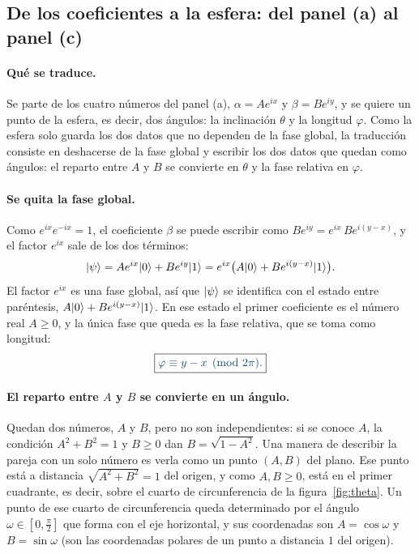 \subsection*{De los coeficientes a la esfera: del panel (a) al panel (c)}

\paragraph{Qué se traduce.}
Se parte de los cuatro números del panel (a), $\alpha=Ae^{ix}$ y $\beta=Be^{iy}$, y se quiere un
punto de la esfera, es decir, dos ángulos: la inclinación $\theta$ y la longitud $\varphi$. Como
la esfera solo guarda los dos datos que no dependen de la fase global, la traducción consiste en
deshacerse de la fase global y escribir los dos datos que quedan como ángulos: el reparto entre
$A$ y $B$ se convierte en $\theta$ y la fase relativa en $\varphi$.

\paragraph{Se quita la fase global.}
Como $e^{ix}e^{-ix}=1$, el coeficiente $\beta$ se puede escribir como
$Be^{iy}=e^{ix}\,Be^{i(y-x)}$, y el factor $e^{ix}$ sale de los dos términos:
\[
  \lvert \psi\rangle=Ae^{ix}\lvert 0\rangle+Be^{iy}\lvert 1\rangle
  =e^{ix}\bigl(A\lvert 0\rangle+Be^{i(y-x)}\lvert 1\rangle\bigr).
\]
El factor $e^{ix}$ es una fase global, así que $\lvert \psi\rangle$ se identifica con el estado entre
paréntesis, $A\lvert 0\rangle+Be^{i(y-x)}\lvert 1\rangle$. En ese estado el primer coeficiente es el número real
$A\ge0$, y la única fase que queda es la fase relativa, que se toma como longitud:
\begin{equation}\label{eq:phi}
  \destacado{\varphi\equiv y-x \pmod{2\pi}.}
\end{equation}

\paragraph{El reparto entre $A$ y $B$ se convierte en un ángulo.}
Quedan dos números, $A$ y $B$, pero no son independientes: si se conoce $A$, la condición
$A^2+B^2=1$ y $B\ge0$ dan $B=\sqrt{1-A^2}$. Una manera de describir la pareja con un solo número
es verla como un punto $(A,B)$ del plano. Ese punto está a distancia $\sqrt{A^2+B^2}=1$ del
origen, y como $A,B\ge0$, está en el primer cuadrante, es decir, sobre el cuarto de
circunferencia de la figura~\ref{fig:theta}. Un punto de ese cuarto de circunferencia queda
determinado por el ángulo $\omega\in[0,\frac\pi2]$ que forma con el eje horizontal, y sus
coordenadas son $A=\cos\omega$ y $B=\sin\omega$ (son las coordenadas polares de un punto a
distancia $1$ del origen).

